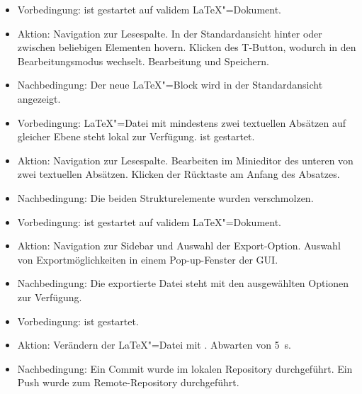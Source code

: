 \begin{itemize}
\item Vorbedingung: \texla{} ist gestartet auf validem \LaTeX"=Dokument.
  \item Aktion: Navigation zur Lesespalte.
  In der Standardansicht hinter oder zwischen beliebigen Elementen hovern.
  Klicken des T-Button, wodurch \texla{} in den Bearbeitungsmodus wechselt.
  Bearbeitung und Speichern.
  \item Nachbedingung: Der neue \LaTeX"=Block wird in der Standardansicht angezeigt.

\end{itemize}

\begin{itemize}
\item Vorbedingung: \LaTeX"=Datei mit mindestens zwei textuellen Absätzen auf gleicher Ebene steht lokal zur
  Verfügung.
  \texla{} ist gestartet.
  \item Aktion: Navigation zur Lesespalte.
  Bearbeiten im Minieditor des unteren von zwei textuellen Absätzen.
  Klicken der Rücktaste am Anfang des Absatzes.
  \item Nachbedingung: Die beiden Strukturelemente wurden verschmolzen.

\end{itemize}
\clearpage


\begin{itemize}
\item Vorbedingung: \texla{} ist gestartet auf validem \LaTeX"=Dokument.
  \item Aktion: Navigation zur Sidebar und Auswahl der Export-Option.
  Auswahl von Exportmöglichkeiten in einem Pop-up-Fenster der GUI.
  \item Nachbedingung: Die exportierte Datei steht mit den ausgewählten Optionen zur Verfügung.

\end{itemize}

\begin{itemize}
\item Vorbedingung: \texla{} ist gestartet.
  \item Aktion: Verändern der \LaTeX"=Datei mit \texla{}.
  Abwarten von 5~\si{\second}.
  \item Nachbedingung: Ein Commit wurde im lokalen Repository durchgeführt.
  Ein Push wurde zum Remote-Repository durchgeführt.

\end{itemize}

